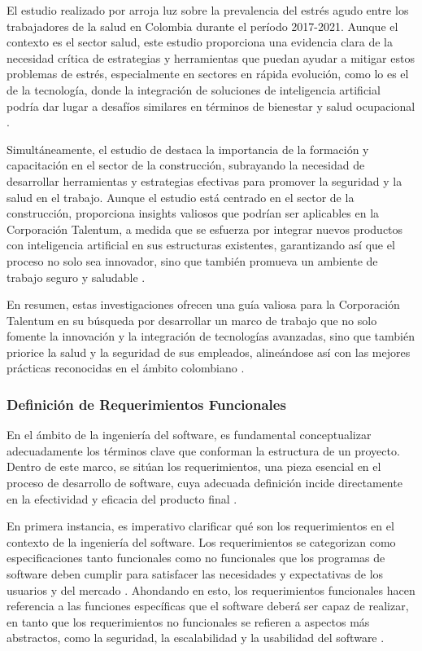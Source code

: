 El estudio realizado por \citep{GonzalezDelgado2023AcuteStudy} arroja luz sobre la prevalencia del estrés agudo entre los trabajadores de la salud en Colombia durante el período 2017-2021. Aunque el contexto es el sector salud, este estudio proporciona una evidencia clara de la necesidad crítica de estrategias y herramientas que puedan ayudar a mitigar estos problemas de estrés, especialmente en sectores en rápida evolución, como lo es el de la tecnología, donde la integración de soluciones de inteligencia artificial podría dar lugar a desafíos similares en términos de bienestar y salud ocupacional \citep{GonzalezDelgado2023AcuteStudy}.

Simultáneamente, el estudio de \citep{Yaneth2021StrategiesSector} destaca la importancia de la formación y capacitación en el sector de la construcción, subrayando la necesidad de desarrollar herramientas y estrategias efectivas para promover la seguridad y la salud en el trabajo. Aunque el estudio está centrado en el sector de la construcción, proporciona insights valiosos que podrían ser aplicables en la Corporación Talentum, a medida que se esfuerza por integrar nuevos productos con inteligencia artificial en sus estructuras existentes, garantizando así que el proceso no solo sea innovador, sino que también promueva un ambiente de trabajo seguro y saludable \citep{Yaneth2021StrategiesSector}.

En resumen, estas investigaciones ofrecen una guía valiosa para la Corporación Talentum en su búsqueda por desarrollar un marco de trabajo que no solo fomente la innovación y la integración de tecnologías avanzadas, sino que también priorice la salud y la seguridad de sus empleados, alineándose así con las mejores prácticas reconocidas en el ámbito colombiano \citep{Yaneth2021StrategiesSector,GonzalezDelgado2023AcuteStudy}.


\subsubsection{Definición de Requerimientos Funcionales}
En el ámbito de la ingeniería del software, es fundamental conceptualizar adecuadamente los términos clave que conforman la estructura de un proyecto. Dentro de este marco, se sitúan los requerimientos, una pieza esencial en el proceso de desarrollo de software, cuya adecuada definición incide directamente en la efectividad y eficacia del producto final \citep{Cipriano2023GPT-3Report,Wu2023AgileDesign}.

En primera instancia, es imperativo clarificar qué son los requerimientos en el contexto de la ingeniería del software. Los requerimientos se categorizan como especificaciones tanto funcionales como no funcionales que los programas de software deben cumplir para satisfacer las necesidades y expectativas de los usuarios y del mercado \citep{Cipriano2023GPT-3Report,Wu2023AgileDesign}. Ahondando en esto, los requerimientos funcionales hacen referencia a las funciones específicas que el software deberá ser capaz de realizar, en tanto que los requerimientos no funcionales se refieren a aspectos más abstractos, como la seguridad, la escalabilidad y la usabilidad del software \citep{Cipriano2023GPT-3Report}.

